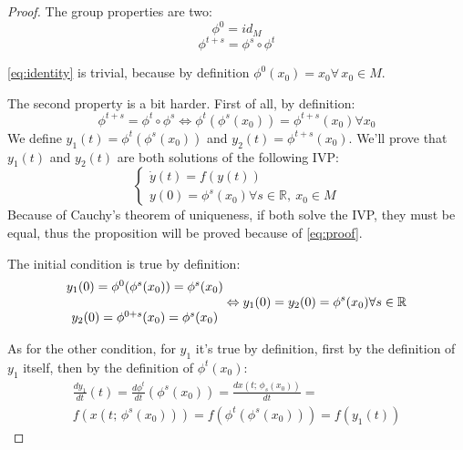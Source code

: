 \begin{proof}
    The group properties are two:
    \begin{equation}
        \phi^0=id_M
        \label{eq:identity}
    \end{equation}
    \begin{equation}
        \phi^{t+s}=\phi^s\circ \phi^t
        \label{eq:composition}
    \end{equation}

    \autoref{eq:identity} is trivial, because by definition $\phi^0(x_0)=x_0\forall\, x_0\in M$.

    The second property is a bit harder. First of all, by definition:
    \begin{equation}
        \phi^{t+s}=\phi^t\circ\phi^s\Leftrightarrow \phi^t(\phi^s(x_0))=\phi^{t+s}(x_0)\forall x_0
        \label{eq:proof}
    \end{equation}
    We define $y_1(t)=\phi^t(\phi^s(x_0))$ and $y_2(t)=\phi^{t+s}(x_0)$. We'll prove that $y_1(t)$ and $y_2(t)$ are both solutions of the following IVP:
    \begin{equation}
        \begin{cases}
            \dot{y}(t)=f(y(t)) \\ y(0)=\phi^s(x_0) \forall s\in\mathbb{R},\ x_0\in M
        \end{cases}
    \end{equation}
    Because of Cauchy's theorem of uniqueness, if both solve the IVP, they must be equal, thus the proposition will be proved because of \autoref{eq:proof}. 

    The initial condition is true by definition:
    \begin{equation*}
        \begin{matrix}
        y_1(0)=\phi^{0}(\phi^s(x_0))=\phi^s(x_0) \cr \cr y_2(0)=\phi^{0+s}(x_0)=\phi^{s}(x_0) \cr
        \end{matrix} \Leftrightarrow y_1(0)=y_2(0)=\phi^s(x_0)\forall s\in \mathbb{R}
    \end{equation*}

    As for the other condition, for $y_1$ it's true by definition, first by the definition of $y_1$ itself, then by the definition of $\phi^t(x_0)$:
        \begin{equation*}
        \begin{aligned}
        \frac{dy_1}{dt}(t)=\frac{d\phi^t}{dt}(\phi^s(x_0))=\frac{dx(t;\,\phi_s(x_0))}{dt}= \\
        f(x(t;\,\phi^s(x_0)))=f(\phi^t(\phi^s(x_0)))=f(y_1(t))
        \end{aligned}
        \end{equation*}


\end{proof}
